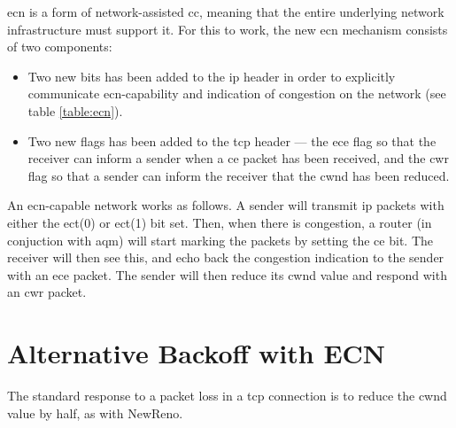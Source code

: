 \gls{ecn} is a form of network-assisted \gls{cc}, meaning that the entire underlying network infrastructure must support it. For this to work, the new \gls{ecn} mechanism consists of two components:

\begin{itemize}
    \item Two new bits has been added to the \gls{ip} header in order to explicitly communicate \gls{ecn}-capability and indication of congestion on the network (see table \ref{table:ecn}).
    \item Two new flags has been added to the \gls{tcp} header --- the \gls{ece} flag so that the receiver can inform a sender when a \gls{ce} packet has been received, and the \gls{cwr} flag so that a sender can inform the receiver that the \gls{cwnd} has been reduced.
\end{itemize}

An \gls{ecn}-capable network works as follows. A sender will transmit \gls{ip} packets with either the \gls{ect}(0) or \gls{ect}(1) bit set. Then, when there is congestion, a router (in conjuction with \gls{aqm}) will start marking the packets by setting the \gls{ce} bit. The receiver will then see this, and echo back the congestion indication to the sender with an \gls{ece} packet. The sender will then reduce its \gls{cwnd} value and respond with an \gls{cwr} packet.















\section{Alternative Backoff with ECN}

The standard response to a packet loss in a \gls{tcp} connection is to reduce the \gls{cwnd} value by half, as with NewReno. 